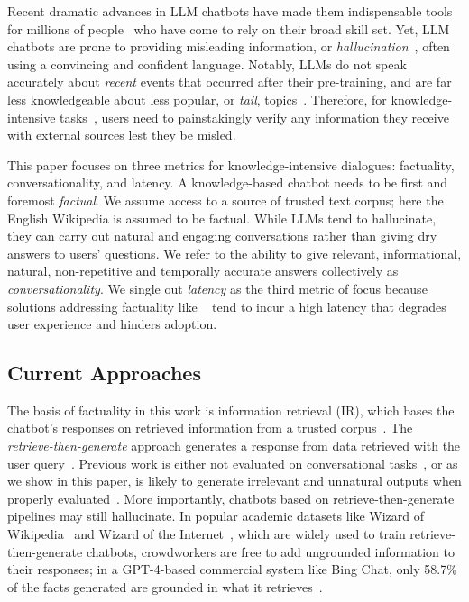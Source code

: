 \documentclass[11pt]{article}
\begin{document}
Recent dramatic advances in LLM chatbots have made them indispensable tools for millions of people~\cite{chatgpt-users2023} who have come to rely on their broad skill set.
Yet, LLM chatbots are prone to providing misleading information, or \emph{hallucination}~\cite{bang2023multitask}, often using a convincing and confident language. Notably, LLMs do not speak accurately about {\em recent} events that occurred after their pre-training, and are far less knowledgeable about less popular, or {\em tail}, topics~\cite{mallen2022trust, sun2023headtotail}.
Therefore, for knowledge-intensive tasks~\cite{lewis2020retrieval}, users need to painstakingly verify any information they receive with external sources lest they be misled.

This paper focuses on three metrics for knowledge-intensive dialogues: factuality, conversationality, and latency. 
A knowledge-based chatbot needs to be first and foremost \emph{factual}. We assume access to a source of trusted text corpus; here the English Wikipedia is assumed to be factual. While LLMs tend to hallucinate, they can carry out natural and engaging conversations rather than giving dry answers to users' questions. We refer to the ability to give relevant, informational, natural, non-repetitive and temporally accurate answers collectively as \emph{conversationality}.
We single out {\em latency} as the third metric of focus because solutions addressing factuality like ~\citet{gao-etal-2023-rarr, jiang2023active, trivedi-etal-2023-interleaving, zhao2023verifyandedit} tend to incur a high latency that degrades user experience and hinders adoption. 

\subsection{Current Approaches}
The basis of factuality in this work is information retrieval (IR), which bases the chatbot's responses on retrieved information from a trusted corpus~\cite{zhang2023large,   li2022survey, shuster-etal-2021-retrieval-augmentation}. The \emph{retrieve-then-generate} approach generates a response from data retrieved with the user query~\cite{lewis2020retrieval, trivedi-etal-2023-interleaving, izacard2022atlas, shuster2022blenderbot, chen2021blenderbot}. Previous work is either not evaluated on conversational tasks~\cite{lewis2020retrieval, trivedi-etal-2023-interleaving, shi2023replug}, or as we show in this paper, is likely to generate irrelevant and unnatural outputs when properly evaluated~\cite{izacard2022atlas}.
More importantly, chatbots based on retrieve-then-generate pipelines may still hallucinate. In popular academic datasets like Wizard of Wikipedia~\cite{dinan2019wizard} and Wizard of the Internet~\cite{komeili-etal-2022-internet}, which are widely used to train retrieve-then-generate chatbots, crowdworkers are free to add ungrounded information to their responses; in a GPT-4-based commercial system like Bing Chat, only 58.7\% of the facts generated are grounded in what it retrieves~\cite{bingchat2023}.
\end{document}
